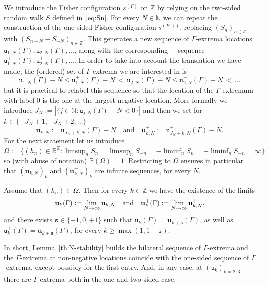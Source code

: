 \documentclass[AHL,Unicode,longabstracts,published]{cedram}
\newcommand{\bfu}{\mathbf{u}}
\newcommand{\bbN}{\mathbb{N}}
\newcommand{\bbP}{\mathbb{P}}
\newcommand{\bbR}{\mathbb{R}}
\newcommand{\bbZ}{\mathbb{Z}}
\newcommand{\gG}{\Gamma}
\newcommand{\gO}{\Omega}
\renewcommand*\ss{\mathtt{u}}
\newcommand{\tu}{\ss}
\newcommand{\ts}{\mathtt{s}}
\renewcommand*{\to}{\mathchoice{\longrightarrow}{\rightarrow}{\rightarrow}{\rightarrow}}
\begin{document}
We introduce the Fisher configuration $s^{(F)}$ on $\bbZ$ by relying on the two-sided random walk $S$ defined in~\eqref{eq:Sn}. For every $N\in \bbN$ we can repeat the construction of the one-sided Fisher configuration $s^{(F,+)}$, replacing $(S_n)_{n \in \bbZ}$ with $(S_{n-N}-S_{-N})_{n \in \bbZ}$. This generates a new sequence of $\gG$-extrema locations $\tu_{1,N}(\gG), \tu_{2,N}(\gG), \dots$, along with the corresponding $+$ sequence $\tu^+_{1,N}(\gG), \tu^+_{2,N}(\gG), \dots$. In order to take into account the translation we have made, the (ordered) set of $\gG$-extrema we are interested in is
\begin{equation}
\tu_{1,N}(\gG)-N \le \tu^+_{1,N}(\gG)-N\, < \,
\tu_{2,N}(\gG)-N \le \tu^+_{2,N}(\gG)-N\, < \, \dots
\end{equation}
but it is practical to relabel this sequence so that the location of the $\gG$-extremum with label $0$ is the one at the largest negative location. More formally we introduce $J_N:= | \{ j\in \bbN: \tu_{j,N}(\gG)-N < 0 \} |$ and then we set for $k\in \{ -J_N+1, -J_N+2, \dots\}$
\begin{equation}
\bfu_{k, N}:= \tu_{J_N+k,N}(\gG)-N
\quad\text{and}\quad\bfu^+_{k, N}:= \tu^+_{J_N+k,N}(\gG)-N.
\end{equation}
For the next statement let us introduce $\gO\!:=\!\{(h_n)\!\in\! \bbR^\bbZ: \limsup_n S_{n}\!=\!\limsup_n S_{-n} =- \liminf_n S_{n}=- \liminf_n S_{-n}= \infty\}$ so (with abuse of notation) $\bbP(\gO)=1$. Restricting to $\gO$ ensures in particular that $(\bfu_{k, N})_k$ and $(\bfu^+_{k, N})_k$ are infinite sequences, for every $N$.


\begin{lemm}\label{th:N-stability}
Assume that $(h_n) \in \gO$. Then for every $k\in \bbZ$ we have the existence of the limits
\begin{equation}\label{eq:N-stability-existence}
\bfu_{k}(\gG) :=
\lim_{N \to \infty} \bfu_{k, N}
\quad\text{and}\quad \bfu^+_{k} (\gG) := \lim_{N \to \infty} \bfu^+_{k, N},
\end{equation}
and there exists $\ts\in \{-1, 0, +1\}$ such that $\tu_k(\gG)= \bfu_{k+\ts}(\gG)$, as well as $\tu^+_k(\gG)= \bfu^+_{k+\ts}(\gG)$, for every $k\ge \max(1, 1-\ts)$.
\end{lemm}

In short, Lemma~\ref{th:N-stability} builds the bilateral sequence of $\gG$-extrema and the $\gG$-extrema at non-negative locations coincide with the one-sided sequence of $\gG$-extrema, except possibly for the first entry. And, in any case, at $(\tu_k)_{k=2,3, \dots}$ there are $\gG$-extrema both in the one and two-sided case.
\end{document}
